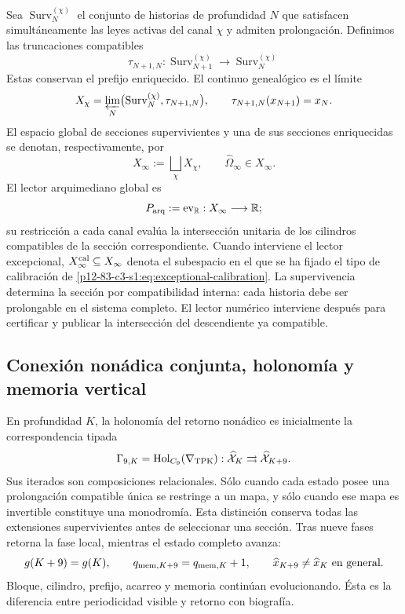 {Sea \(\operatorname{Surv}^{(\chi)}_N\) el conjunto de historias de
profundidad \(N\) que satisfacen simultáneamente las leyes activas del canal
\(\chi\) y admiten prolongación. Definimos las truncaciones compatibles
\[
\tau_{N+1,N}:\operatorname{Surv}^{(\chi)}_{N+1}
\longrightarrow\operatorname{Surv}^{(\chi)}_N
\]
Estas conservan el prefijo enriquecido. El continuo genealógico es el límite
\begin{equation}
X_\chi=\varprojlim_N
\bigl(\operatorname{Surv}^{(\chi)}_N,\tau_{N+1,N}\bigr),
\qquad
\tau_{N+1,N}(x_{N+1})=x_N.
\label{p12-83-c3-s1:eq:inverse-survival}
\end{equation}
El espacio global de secciones supervivientes y una de sus secciones
enriquecidas se denotan, respectivamente, por
\begin{equation}
X_\infty:=\bigsqcup_\chi X_\chi,
\qquad
\widehat\Omega_\infty\in X_\infty.
\label{p12-83-c3-s1:eq:global-survival-space}
\end{equation}
El lector arquimediano global es
\begin{equation}
P_{\rm arq}:=\operatorname{ev}_{\mathbb R}:
X_\infty\longrightarrow\mathbb R;
\label{p12-83-c3-s1:eq:archimedean-reader}
\end{equation}
su restricción a cada canal evalúa la intersección unitaria de los cilindros
compatibles de la sección correspondiente.
Cuando interviene el lector excepcional, \(X_\infty^{\rm cal}\subseteq
X_\infty\) denota el subespacio en el que se ha fijado el tipo de calibración
de \eqref{p12-83-c3-s1:eq:exceptional-calibration}.
La supervivencia determina la sección por compatibilidad interna: cada
historia debe ser prolongable en el sistema completo. El lector numérico
interviene después para certificar y publicar la intersección del
descendiente ya compatible.

\subsection{Conexión nonádica conjunta, holonomía y memoria vertical}

En profundidad \(K\), la holonomía del retorno nonádico es inicialmente la
correspondencia tipada
\begin{equation}
\Gamma_{9,K}=\operatorname{Hol}_{C_9}(\nabla_{\rm TPK}):
\widehat{\mathcal X}_K\rightrightarrows
\widehat{\mathcal X}_{K+9}.
\label{p12-83-c3-s1:eq:gamma9}
\end{equation}
Sus iterados son composiciones relacionales. Sólo cuando cada estado posee
una prolongación compatible única se restringe a un mapa, y sólo cuando ese
mapa es invertible constituye una monodromía. Esta distinción conserva todas
las extensiones supervivientes antes de seleccionar una sección.
Tras nueve fases retorna la fase local, mientras el estado completo avanza:
\[
g(K+9)=g(K),\qquad q_{{\rm mem},K+9}=q_{{\rm mem},K}+1,
\qquad \widehat x_{K+9}\ne\widehat x_K\ \text{en general}.
\]
Bloque, cilindro, prefijo, acarreo y memoria continúan evolucionando. Ésta
es la diferencia entre periodicidad visible y retorno con biografía.

}
